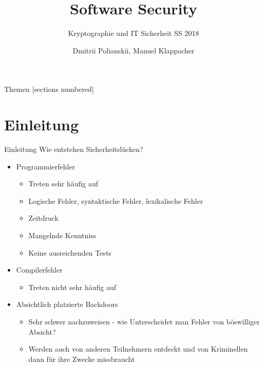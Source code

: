 \documentclass[10pt]{beamer}
\title{Software Security}
\subtitle{Kryptographie und IT Sicherheit SS 2018}
\date{}
\author{Dmitrii Polianskii, Manuel Klappacher}
\institute{Universit\"at Salzburg}
\begin{document}
\maketitle

\begin{frame}{Themen}
  [sections numbered]
  \tableofcontents[hideallsubsections]
\end{frame}


\section{Einleitung}

\begin{frame}[fragile]{Einleitung}
  Wie entstehen Sicherheitsl\"ucken?
  \begin{itemize}
    \item Programmierfehler
      \begin{itemize}
        \item Treten sehr h\"aufig auf
        \item Logische Fehler, syntaktische Fehler, lexikalische Fehler
        \item Zeitdruck
        \item Mangelnde Kenntniss
        \item Keine ausreichenden Tests
      \end{itemize}
    \item Compilerfehler
      \begin{itemize}
        \item Treten nicht sehr h\"aufig auf
      \end{itemize}
    \item Absichtlich platzierte Backdoors
      \begin{itemize}
        \item Sehr schwer nachzuweisen - wie Unterscheidet man Fehler von b\"oswilliger Absicht?
        \item Werden auch von anderen Teilnehmern entdeckt und von Kriminellen dann f\"ur ihre Zwecke missbraucht
      \end{itemize}
  \end{itemize}
\end{frame}
\end{document}
